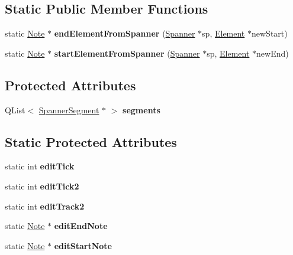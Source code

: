 \subsection*{Static Public Member Functions}
\begin{DoxyCompactItemize}
\item 
\mbox{\label{class_ms_1_1_spanner_a457817e4f3d7e8547f259c955b7f1e85}} 
static \hyperlink{class_ms_1_1_note}{Note} $\ast$ {\bfseries end\+Element\+From\+Spanner} (\hyperlink{class_ms_1_1_spanner}{Spanner} $\ast$sp, \hyperlink{class_ms_1_1_element}{Element} $\ast$new\+Start)
\item 
\mbox{\label{class_ms_1_1_spanner_ac253df3bb8ee2eac3a6aa18a1d21e774}} 
static \hyperlink{class_ms_1_1_note}{Note} $\ast$ {\bfseries start\+Element\+From\+Spanner} (\hyperlink{class_ms_1_1_spanner}{Spanner} $\ast$sp, \hyperlink{class_ms_1_1_element}{Element} $\ast$new\+End)
\end{DoxyCompactItemize}
\subsection*{Protected Attributes}
\begin{DoxyCompactItemize}
\item 
\mbox{\label{class_ms_1_1_spanner_a6def43424b4e5d08f11778b0373e332a}} 
Q\+List$<$ \hyperlink{class_ms_1_1_spanner_segment}{Spanner\+Segment} $\ast$ $>$ {\bfseries segments}
\end{DoxyCompactItemize}
\subsection*{Static Protected Attributes}
\begin{DoxyCompactItemize}
\item 
\mbox{\label{class_ms_1_1_spanner_a550c845116997f1a2573b44192d908ab}} 
static int {\bfseries edit\+Tick}
\item 
\mbox{\label{class_ms_1_1_spanner_a24f5751aba719f4b5d46db182a5a687c}} 
static int {\bfseries edit\+Tick2}
\item 
\mbox{\label{class_ms_1_1_spanner_a5ec8c09f5d915959d1af27eb3ddade75}} 
static int {\bfseries edit\+Track2}
\item 
\mbox{\label{class_ms_1_1_spanner_add1c0d6a6d9a2e49c3b1704a7d48c96f}} 
static \hyperlink{class_ms_1_1_note}{Note} $\ast$ {\bfseries edit\+End\+Note}
\item 
\mbox{\label{class_ms_1_1_spanner_ab996d1a9d9c5a629cddfc29a7de02ca5}} 
static \hyperlink{class_ms_1_1_note}{Note} $\ast$ {\bfseries edit\+Start\+Note}
\end{DoxyCompactItemize}
